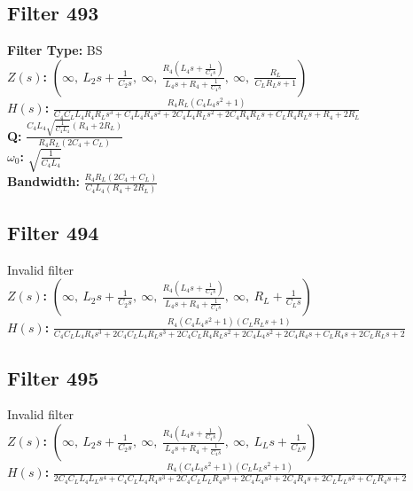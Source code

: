 \documentclass{article}
\begin{document}
\subsection*{Filter 493}
\textbf{Filter Type:} BS \\ 
\textbf{$Z(s)$:} $\left( \infty, \  L_{2} s + \frac{1}{C_{2} s}, \  \infty, \  \frac{R_{4} \left(L_{4} s + \frac{1}{C_{4} s}\right)}{L_{4} s + R_{4} + \frac{1}{C_{4} s}}, \  \infty, \  \frac{R_{L}}{C_{L} R_{L} s + 1}\right)$ \\ 
\textbf{$H(s)$:} $\frac{R_{4} R_{L} \left(C_{4} L_{4} s^{2} + 1\right)}{C_{4} C_{L} L_{4} R_{4} R_{L} s^{3} + C_{4} L_{4} R_{4} s^{2} + 2 C_{4} L_{4} R_{L} s^{2} + 2 C_{4} R_{4} R_{L} s + C_{L} R_{4} R_{L} s + R_{4} + 2 R_{L}}$ \\ 
\textbf{Q:} $\frac{C_{4} L_{4} \sqrt{\frac{1}{C_{4} L_{4}}} \left(R_{4} + 2 R_{L}\right)}{R_{4} R_{L} \left(2 C_{4} + C_{L}\right)}$ \\ 
\textbf{$\omega_0$:} $\sqrt{\frac{1}{C_{4} L_{4}}}$ \\ 
\textbf{Bandwidth:} $\frac{R_{4} R_{L} \left(2 C_{4} + C_{L}\right)}{C_{4} L_{4} \left(R_{4} + 2 R_{L}\right)}$ \\ 
\subsection*{Filter 494}
Invalid filter \\ 
\textbf{$Z(s)$:} $\left( \infty, \  L_{2} s + \frac{1}{C_{2} s}, \  \infty, \  \frac{R_{4} \left(L_{4} s + \frac{1}{C_{4} s}\right)}{L_{4} s + R_{4} + \frac{1}{C_{4} s}}, \  \infty, \  R_{L} + \frac{1}{C_{L} s}\right)$ \\ 
\textbf{$H(s)$:} $\frac{R_{4} \left(C_{4} L_{4} s^{2} + 1\right) \left(C_{L} R_{L} s + 1\right)}{C_{4} C_{L} L_{4} R_{4} s^{3} + 2 C_{4} C_{L} L_{4} R_{L} s^{3} + 2 C_{4} C_{L} R_{4} R_{L} s^{2} + 2 C_{4} L_{4} s^{2} + 2 C_{4} R_{4} s + C_{L} R_{4} s + 2 C_{L} R_{L} s + 2}$ \\ 
\subsection*{Filter 495}
Invalid filter \\ 
\textbf{$Z(s)$:} $\left( \infty, \  L_{2} s + \frac{1}{C_{2} s}, \  \infty, \  \frac{R_{4} \left(L_{4} s + \frac{1}{C_{4} s}\right)}{L_{4} s + R_{4} + \frac{1}{C_{4} s}}, \  \infty, \  L_{L} s + \frac{1}{C_{L} s}\right)$ \\ 
\textbf{$H(s)$:} $\frac{R_{4} \left(C_{4} L_{4} s^{2} + 1\right) \left(C_{L} L_{L} s^{2} + 1\right)}{2 C_{4} C_{L} L_{4} L_{L} s^{4} + C_{4} C_{L} L_{4} R_{4} s^{3} + 2 C_{4} C_{L} L_{L} R_{4} s^{3} + 2 C_{4} L_{4} s^{2} + 2 C_{4} R_{4} s + 2 C_{L} L_{L} s^{2} + C_{L} R_{4} s + 2}$ \\ 
\end{document}
